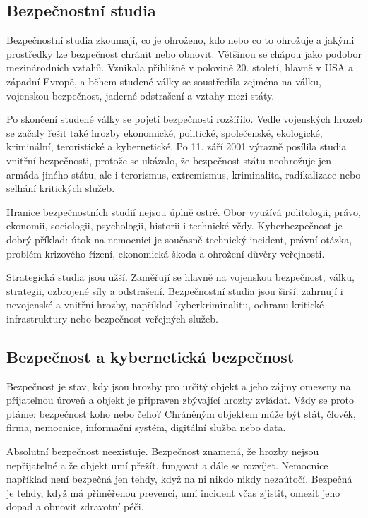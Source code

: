 \subsection*{Bezpečnostní studia}
Bezpečnostní studia zkoumají, co je ohroženo, kdo nebo co to ohrožuje a jakými prostředky lze bezpečnost chránit nebo obnovit. Většinou se chápou jako podobor mezinárodních vztahů. Vznikala přibližně v polovině 20. století, hlavně v USA a západní Evropě, a během studené války se soustředila zejména na válku, vojenskou bezpečnost, jaderné odstrašení a vztahy mezi státy.

Po skončení studené války se pojetí bezpečnosti rozšířilo. Vedle vojenských hrozeb se začaly řešit také hrozby ekonomické, politické, společenské, ekologické, kriminální, teroristické a kybernetické. Po 11. září 2001 výrazně posílila studia vnitřní bezpečnosti, protože se ukázalo, že bezpečnost státu neohrožuje jen armáda jiného státu, ale i terorismus, extremismus, kriminalita, radikalizace nebo selhání kritických služeb.

Hranice bezpečnostních studií nejsou úplně ostré. Obor využívá politologii, právo, ekonomii, sociologii, psychologii, historii i technické vědy. Kyberbezpečnost je dobrý příklad: útok na nemocnici je současně technický incident, právní otázka, problém krizového řízení, ekonomická škoda a ohrožení důvěry veřejnosti.

Strategická studia jsou užší. Zaměřují se hlavně na vojenskou bezpečnost, válku, strategii, ozbrojené síly a odstrašení. Bezpečnostní studia jsou širší: zahrnují i nevojenské a vnitřní hrozby, například kyberkriminalitu, ochranu kritické infrastruktury nebo bezpečnost veřejných služeb.

\subsection*{Bezpečnost a kybernetická bezpečnost}
Bezpečnost je stav, kdy jsou hrozby pro určitý objekt a jeho zájmy omezeny na přijatelnou úroveň a objekt je připraven zbývající hrozby zvládat. Vždy se proto ptáme: bezpečnost koho nebo čeho? Chráněným objektem může být stát, člověk, firma, nemocnice, informační systém, digitální služba nebo data.

Absolutní bezpečnost neexistuje. Bezpečnost znamená, že hrozby nejsou nepřijatelné a že objekt umí přežít, fungovat a dále se rozvíjet. Nemocnice například není bezpečná jen tehdy, když na ni nikdo nikdy nezaútočí. Bezpečná je tehdy, když má přiměřenou prevenci, umí incident včas zjistit, omezit jeho dopad a obnovit zdravotní péči.

